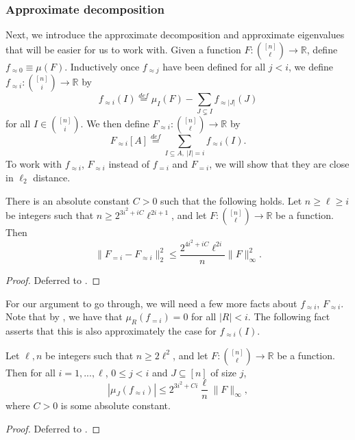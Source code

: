 \documentclass{toc}
\newcommand\card[1]{\left| {#1} \right|}
\newcommand\norm[1]{\| #1 \|}
\newcommand\defeq{\stackrel{def}{=}}
\renewcommand\geq{\geqslant}
\renewcommand\leq{\leqslant}
\newcommand\lvlfn[2]{{#1}_{={#2}}}
\newcommand\approxlvlfn[2]{{#1}_{\approx{#2}}}
\begin{document}
\subsubsection{Approximate decomposition}
Next, we introduce the approximate decomposition and approximate eigenvalues that will be easier for us to work with.
Given a function $F\colon {[n] \choose \ell}\to\mathbb{R}$,
define $\approxlvlfn{f}{0}\equiv \mu(F)$. Inductively once
$\approxlvlfn{f}{j}$ have been defined for all $j<i$, we define $\approxlvlfn{f}{i}\colon {[n]\choose i}\to\mathbb{R}$ by
\[
\approxlvlfn{f}{i}(I) \defeq \mu_{I}(F) - \sum\limits_{J\subsetneq I}{\approxlvlfn{f}{\card{J}}(J)}
\]
for all $I\in {[n] \choose i}$. We then define $\approxlvlfn{F}{i}\colon \binom{[n]}{\ell}\to\mathbb{R}$ by %
\[
\approxlvlfn{F}{i}[A] \defeq \sum\limits_{I\subseteq A,~\card{I} = i}{\approxlvlfn{f}{i}(I)}.
\]
To work with $\approxlvlfn{f}{i}$, $\approxlvlfn{F}{i}$ instead of $\lvlfn{f}{i}$ and $\lvlfn{F}{i}$, we will show that they are close in $\ell_{2}$ distance.
\begin{theorem}\label{thm:approx}
There is an absolute %
constant $C>0$ such that the following holds.
Let $n\geq \ell\geq i$ be integers such that $n\geq 2^{3i^2+iC} \ell^{2i+1}$, and let
$F\colon {[n]\choose \ell}\to\mathbb{R}$ be a function. Then
\[
\norm{\lvlfn{F}{i}-\approxlvlfn{F}{i}}_{2}^2
\leq \frac{2^{4i^2+iC} \ell^{2i}}{n} \norm{F}_{\infty}^2.
\]
\end{theorem}
\begin{proof}
  Deferred to %
  .   %
\end{proof}


For our argument to go through, we will need a few more facts %
about $\approxlvlfn{f}{i}$, $\approxlvlfn{F}{i}$.
Note that by , we have that $\mu_R(\lvlfn{f}{i}) = 0$ for all $\card{R} < i$. The following
fact asserts that this is also approximately the case for $\approxlvlfn{f}{i}(I)$.
\begin{fact}\label{fact:purp}
Let $\ell, n$ be integers such that $n\geq 2\ell^2$, and let
$F\colon {[n]\choose \ell}\to\mathbb{R}$ be a function.
Then for all $i=1,...,\ell$, $0\leq j<i$ and $J\subseteq [n]$ of size $j$,
\[
\card{\mu_J(\approxlvlfn{f}{i})}%
\leq 2^{3i^2 + Ci} \frac{\ell}{n} \norm{F}_{\infty},
\]
where $C>0$ is some absolute constant.
\end{fact}
\begin{proof}
  Deferred to %
  .   %
\end{proof}
\end{document}

